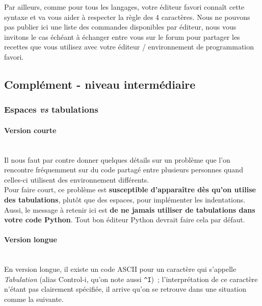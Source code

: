 Par ailleurs, comme pour tous les langages, votre éditeur favori connaît
cette syntaxe et va vous aider à respecter la règle des 4 caractères.
Nous ne pouvons pas publier ici une liste des commandes disponibles par
éditeur, nous vous invitons le cas échéant à échanger entre vous sur le
forum pour partager les recettes que vous utilisez avec votre éditeur /
environnement de programmation favori.

    \hypertarget{compluxe9ment---niveau-intermuxe9diaire}{%
\subsection{Complément - niveau
intermédiaire}\label{compluxe9ment---niveau-intermuxe9diaire}}

    \hypertarget{espaces-vs-tabulations}{%
\subsubsection{\texorpdfstring{Espaces \emph{vs}
tabulations}{Espaces vs tabulations}}\label{espaces-vs-tabulations}}

    \hypertarget{version-courte}{%
\paragraph{Version courte\\\\}\label{version-courte}}

    Il nous faut par contre donner quelques détails sur un problème que l'on
rencontre fréquemment sur du code partagé entre plusieurs personnes
quand celles-ci utilisent des environnement différents.\\

Pour faire court, ce problème est \textbf{susceptible d'apparaître dès
qu'on utilise des tabulations}, plutôt que des espaces, pour implémenter
les indentations. Aussi, le message à retenir ici est \textbf{de ne
jamais utiliser de tabulations dans votre code Python}. Tout bon éditeur
Python devrait faire cela par défaut.

    \hypertarget{version-longue}{%
\paragraph{Version longue\\\\}\label{version-longue}}

    En version longue, il existe un code ASCII pour un caractère qui
s'appelle \emph{Tabulation} (alias Control-i, qu'on note aussi
\texttt{\^{}I})~; l'interprétation de ce caractère n'étant pas
clairement spécifiée, il arrive qu'on se retrouve dans une situation
comme la suivante.\\

